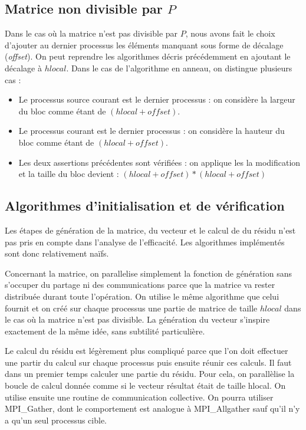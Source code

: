 \documentclass[a4paper]{article}
\begin{document}
\subsection{Matrice non divisible par $P$}

Dans le cas où la matrice n'est pas divisible par $P$, nous avons fait
le choix d'ajouter au dernier processus les éléments manquant sous
forme de décalage (\emph{offset}). On peut reprendre les algorithmes
décris précédemment en ajoutant le décalage à $hlocal$. Dans le cas de
l'algorithme en anneau, on distingue plusieurs cas :
\begin{itemize}
\item Le processus source courant est le dernier processus : on
considère la largeur du bloc comme étant de $(hlocal + offset)$.
\item Le processus courant est le dernier processus : on considère la
hauteur du bloc comme étant de $(hlocal + offset)$.
\item Les deux assertions précédentes sont vérifiées : on applique les
la modification et la taille du bloc devient : $(hlocal + offset) *
(hlocal + offset)$
\end{itemize}

\subsection{Algorithmes d'initialisation et de vérification}

Les étapes de génération de la matrice, du vecteur et le calcul de du
résidu n'est pas pris en compte dans l'analyse de l'efficacité. Les
algorithmes implémentés sont donc relativement naïfs.

Concernant la matrice, on parallelise simplement la fonction de
génération sans s'occuper du partage ni des communications parce que
la matrice va rester distribuée durant toute l'opération. On utilise
le même algorithme que celui fournit et on créé sur chaque processus
une partie de matrice de taille $hlocal$ dans le cas où la
matrice n'est pas divisible. La génération du vecteur s'inspire
exactement de la même idée, sans subtilité particulière.

Le calcul du résidu est légèrement plus compliqué parce que l'on doit
effectuer une partir du calcul sur chaque processus puis ensuite
réunir ces calculs. Il faut dans un premier temps calculer une partie
du résidu. Pour cela, on parallèlise la boucle de calcul donnée comme
si le vecteur résultat était de taille hlocal. On utilise ensuite une
routine de communication collective. On pourra utiliser MPI\_Gather,
dont le comportement est analogue à MPI\_Allgather sauf qu'il n'y a
qu'un seul processus cible.
\end{document}
